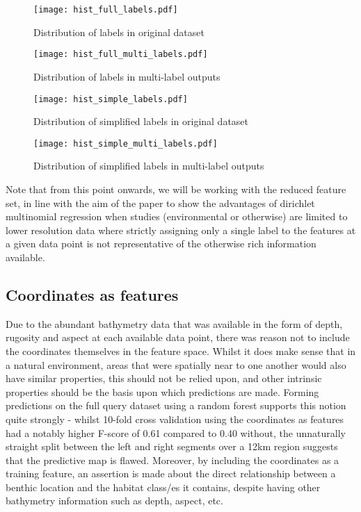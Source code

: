\begin{figure}[H]
    \begin{minipage}{.47\linewidth}
        \texttt{[image: hist\_full\_labels.pdf]}
        \caption{Distribution of labels in original dataset}
        \label{fig:singlelabeldistr}
    \end{minipage}
    \hfill
    \begin{minipage}{.47\linewidth}
        \texttt{[image: hist\_full\_multi\_labels.pdf]}
        \caption{Distribution of labels in multi-label outputs}
        \label{fig:multilabeldistr}
    \end{minipage}
\end{figure}

\begin{figure}[H]
    \begin{minipage}{.47\linewidth}
        \texttt{[image: hist\_simple\_labels.pdf]}
        \caption{Distribution of simplified labels in original dataset}
        \label{fig:singlelabeldistr}
    \end{minipage}
    \hfill
    \begin{minipage}{.47\linewidth}
        \texttt{[image: hist\_simple\_multi\_labels.pdf]}
        \caption{Distribution of simplified labels in multi-label outputs}
        \label{fig:multilabeldistr}
    \end{minipage}
\end{figure}

Note that from this point onwards, we will be working with the reduced feature set, in line with the aim of the paper to show the advantages of dirichlet multinomial regression when studies (environmental or otherwise) are limited to lower resolution data where strictly assigning only a single label to the features at a given data point is not representative of the otherwise rich information available.

\subsection{Coordinates as features}
Due to the abundant bathymetry data that was available in the form of depth, rugosity and aspect at each available data point, there was reason not to include the coordinates themselves in the feature space. Whilst it does make sense that in a natural environment, areas that were spatially near to one another would also have similar properties, this should not be relied upon, and other intrinsic properties should be the basis upon which predictions are made. Forming predictions on the full query dataset using a random forest supports this notion quite strongly - whilst 10-fold cross validation using the coordinates as features had a notably higher F-score of 0.61 compared to 0.40 without, the unnaturally straight split between the left and right segments over a 12km region suggests that the predictive map is flawed. Moreover, by including the coordinates as a training feature, an assertion is made about the direct relationship between a benthic location and the habitat class/es it contains, despite having other bathymetry information such as depth, aspect, etc. 

